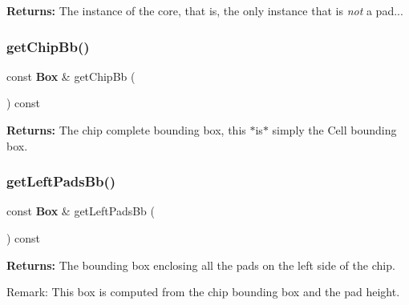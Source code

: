 {\bfseries Returns\+:} The instance of the core, that is, the only instance that is {\itshape not} a pad... \mbox{\label{classKatabatic_1_1ChipTools_ada9182cc0bcdb47b156a29cf42d08651}} 
\subsubsection{\texorpdfstring{get\+Chip\+Bb()}{getChipBb()}}
{\footnotesize\ttfamily const \textbf{ Box} \& get\+Chip\+Bb (\begin{DoxyParamCaption}{ }\end{DoxyParamCaption}) const\hspace{0.3cm}{\ttfamily [inline]}}

{\bfseries Returns\+:} The chip complete bounding box, this $\ast$is$\ast$ simply the Cell bounding box. \mbox{\label{classKatabatic_1_1ChipTools_aa6b5ac93ecf1ee9f94f5176664dcf4bf}} 
\subsubsection{\texorpdfstring{get\+Left\+Pads\+Bb()}{getLeftPadsBb()}}
{\footnotesize\ttfamily const \textbf{ Box} \& get\+Left\+Pads\+Bb (\begin{DoxyParamCaption}{ }\end{DoxyParamCaption}) const\hspace{0.3cm}{\ttfamily [inline]}}

{\bfseries Returns\+:} The bounding box enclosing all the pads on the left side of the chip.

\begin{DoxyParagraph}{Remark\+: This box is computed from the chip bounding box and the pad height. }

\end{DoxyParagraph}
\mbox{\label{classKatabatic_1_1ChipTools_a07e88c4c6a615019e618af327829f4d0}} 
